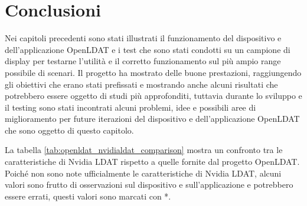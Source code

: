 \chapter{Conclusioni}
\label{chap:outro}

Nei capitoli precedenti sono stati illustrati il funzionamento del dispositivo e dell'applicazione OpenLDAT e i test che sono stati condotti su un campione di display per testarne l'utilità e il corretto funzionamento sul più ampio range possibile di scenari. Il progetto ha mostrato delle buone prestazioni, raggiungendo gli obiettivi che erano stati prefissati e mostrando anche alcuni risultati che potrebbero essere oggetto di studi più approfonditi, tuttavia durante lo sviluppo e il testing sono stati incontrati alcuni problemi, idee e possibili aree di miglioramento per future iterazioni del dispositivo e dell'applicazione OpenLDAT che sono oggetto di questo capitolo.

La tabella \ref{tab:openldat_nvidialdat_comparison} mostra un confronto tra le caratteristiche di Nvidia LDAT rispetto a quelle fornite dal progetto OpenLDAT. Poiché non sono note ufficialmente le caratteristiche di Nvidia LDAT, alcuni valori sono frutto di osservazioni sul dispositivo e sull'applicazione e potrebbero essere errati, questi valori sono marcati con *.

